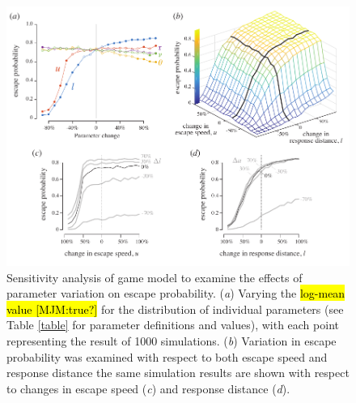 \documentclass[]{rsos}%
\begin{document}
\begin{figure}[!h]
\centering
	\includegraphics[width=5.5in]{fig_sensitivity}
\caption{Sensitivity analysis of game model to examine the effects of parameter variation on escape probability. 
(\textit{a}) Varying the \hl{log-mean value [MJM:true?]} for the distribution of individual parameters (see Table \ref{table} for parameter definitions and values), with each point representing the result of 1000 simulations. 
(\textit{b}) Variation in escape probability was examined with respect to both escape speed and response distance the same simulation results are shown with respect to changes in escape speed (\textit{c}) and response distance (\textit{d}).
}
\label{fig_sense}
\end{figure}

\pagebreak
\end{document}
